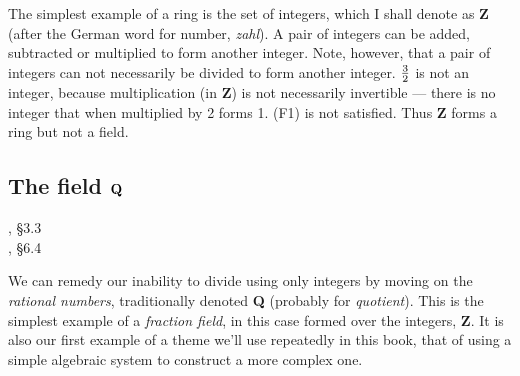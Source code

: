 \begin{comment}

\theorem (The Zero Theorem)

Given a ring ${\cal R}$, $\forall x\in{\cal R}, 0x=0$

\proof

From the equation $0x=0x+0x+(-0x)=(0+0)x+(-0x)=0x+(-0x)=0$.

\begin{tabular}{r c l l @{\vbox to20pt{}}}

$0x+(-0x)$ &=& $0$ & R6 applied to $0x$ \cr
$0+0x$ &=& $0x$ & R5 applied to $0x$ \cr
$0+0x + (-0x)$ &=& $0$ & principle of equality \cr

   & & &\cr

$(0+0x)+(-0x)$ &=& $0$ & principle of equality\cr
$(0\cdot 1+0x)+(-0x)$ &=& $0$ & RwU1\cr
$0(\cdot 1+x)+(-0x)$ &=& $0$ & R4\cr

\end{tabular}

$=(0+0)x+(-0x)=0x+(-0x)=0$.

applied
into , obtained from R5 applied to $0x$, then used R5 to
factor out $(0+0)$ and R6 to replace this with $0$, then R6 again to
conclude that $0x+(-0x)=0$.

Thus, multiplication by zero is a property of all rings.

\endtheorem

\end{comment}

The simplest example of a ring is the set of integers, which I shall
denote as {\bf Z} (after the German word for number, {\it zahl}).  A pair
of integers can be added, subtracted or multiplied to form another
integer.  Note, however, that a pair of integers can not necessarily
be divided to form another integer.  $3 \over 2$ is not an integer,
because multiplication (in {\bf Z}) is not necessarily invertible ---
there is no integer that when multiplied by 2 forms 1.
(F1) is not satisfied.
Thus {\bf Z} forms a ring but not a field.

\subsection*{\qquad The field ${\bf Q}$}
, \S3.3
\\
\qquad [Go14], \S6.4

We can remedy our inability to divide using only integers
by moving on the {\it rational numbers},
traditionally denoted {\bf Q} (probably for {\it quotient}).  This is the
simplest example of a {\it fraction field}, in this case formed over
the integers, {\bf Z}.  It is also our first example of a theme
we'll use repeatedly in this book, that of using a simple
algebraic system to construct a more complex one.

